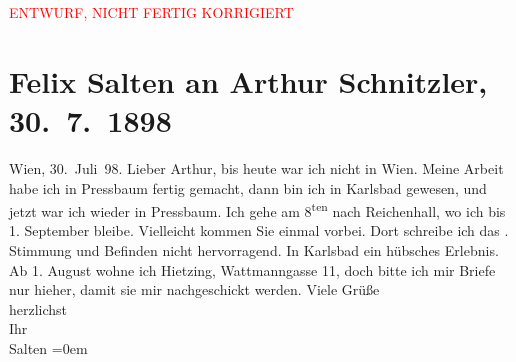 
\begin{center}
            \textcolor{red}{ENTWURF, NICHT FERTIG KORRIGIERT}
                      \end{center}
            
         \renewcommand{\erwaehnteOrte}{Orte: Bad Reichenhall, Karlsbad, Pressbaum, Wattmanngasse, Wien, Österreich}
         \renewcommand{\erwaehnteWerke}{}
               \section[Felix Salten an Arthur Schnitzler, 30. 7. 1898]{ Felix Salten an Arthur Schnitzler, 30. 7. 1898}\nopagebreak{}\rehead{ }\begin{ledgroupsized}[t]{13cm}\normalsize\beginnumbering \toendnotes[C]{\smallbreak\pagebreak[2]} 
\toendnotes[C]{\smallbreak}\pstart
           {\pb}Wien, 30. Juli 98. \pend
           \pstart
           Lieber Arthur, bis heute war ich nicht in Wien. Meine Arbeit habe ich in Pressbaum fertig gemacht, dann bin ich in Karlsbad gewesen, und jetzt war ich wieder in Pressbaum. Ich gehe am 8\textsuperscript{ten} nach Reichenhall, wo ich bis 1.
                  September bleibe. Vielleicht kommen Sie einmal vorbei. Dort schreibe ich
               das \label{K_L03280-1v}\label{K_L03280-1h}. Stimmung und Befinden nicht hervorragend. In Karlsbad ein hübsches Erlebnis. Ab 1.
                  August wohne ich Hietzing, Wattmanngasse
                  11, doch bitte ich mir Briefe nur hieher, damit sie mir nachgeschickt
               werden.\pend
           \pstart
           {\pb}Viele Grüße {\\[\baselineskip]}herzlichst
               {\\[\baselineskip]}Ihr {\\[\baselineskip]}\spacefill\mbox{Salten}\pend
           \leftskip=0em{}
         
         \endnumbering{}\end{ledgroupsized}\begin{anhang}\end{anhang}\newcommand{\dateiname}{L03280}\newcommand{\titel}{Felix Salten an Arthur Schnitzler, 30. 7. 1898}\newcommand{\editorInnen}{Martin Anton Müller und Laura Untner}
      